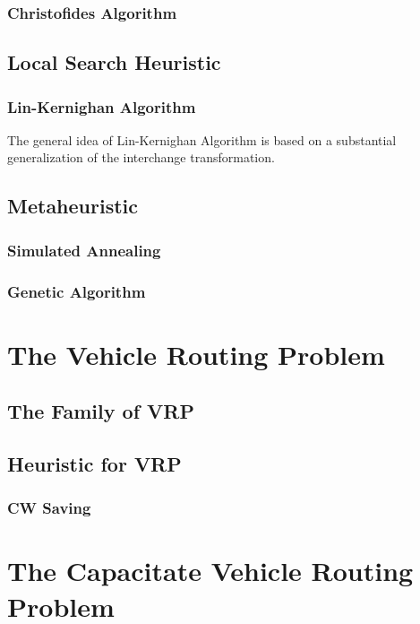 				\subsection{Christofides Algorithm}

			\section{Local Search Heuristic}
				\subsection{Lin-Kernighan Algorithm}
					The general idea of Lin-Kernighan Algorithm is based on a substantial generalization of the interchange transformation.

			\section{Metaheuristic}
				\subsection{Simulated Annealing}

				\subsection{Genetic Algorithm}

		\chapter{The Vehicle Routing Problem}
			\section{The Family of VRP}


			\section{Heuristic for VRP}
				\subsection{CW Saving}

		\chapter{The Capacitate Vehicle Routing Problem}
